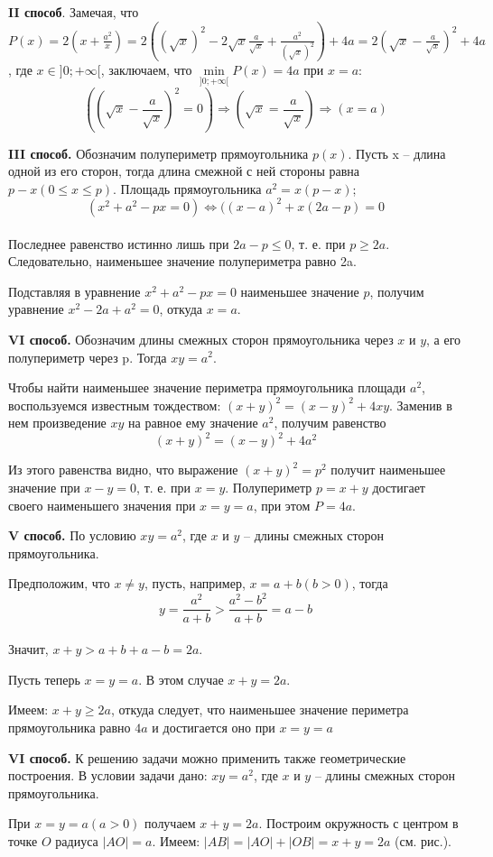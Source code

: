 \documentclass{article}
\begin{document}
\par\textbf{II способ}. Замечая, что $P(x)=2(x+\frac{a^2}{x})=2((\sqrt{x})^2-2\sqrt{x}\frac{a}{\sqrt{x}}+\frac{a^2}{(\sqrt{x})^2})+4a=2(\sqrt{x}-\frac{a}{\sqrt{x}})^2+4a$, где $x\in]0;+\infty[$, заключаем, что $\min\limits_{]0;+\infty[}P(x)=4a$ при $x=a$:
$$((\sqrt{x}-\frac{a}{\sqrt{x}})^2=0)\Rightarrow(\sqrt{x}=\frac{a}{\sqrt{x}})\Rightarrow(x=a)$$
\par\textbf{III способ.} Обозначим полупериметр прямоугольника $p(x)$. Пусть x -- длина одной из его сторон, тогда длина смежной с ней стороны равна $p-x(0\leqslant x\leqslant p)$. Площадь прямоугольника $a^2=x(p-x)$;
$$(x^2+a^2-px=0)\Leftrightarrow((x-a)^2+x(2a-p)=0$$
\\Последнее равенство истинно лишь при $2a-p\leqslant0$, т. е. при $p\geqslant2a$. Следовательно, наименьшее значение полупериметра равно 2a.
\par Подставляя в уравнение $x^2+a^2-px=0$ наименьшее значение $p$, получим уравнение $x^2-2a+a^2=0$, откуда $x=a$.
\par\textbf{VI способ.} Обозначим длины смежных сторон прямоугольника через $x$ и $y$, а его полупериметр через p. Тогда $xy=a^2$.
\par Чтобы найти наименьшее значение периметра прямоугольника площади $a^2$, воспользуемся известным тождеством: $(x+y)^2=(x-y)^2+4xy$. Заменив в нем произведение $xy$ на равное ему значение $a^2$, получим равенство
$$(x+y)^2=(x-y)^2+4a^2$$
\par Из этого равенства видно, что выражение $(x+y)^2=p^2$ получит наименьшее значение при $x-y=0$, т. е. при $x=y$. Полупериметр $p=x+y$ достигает своего наименьшего значения при $x=y=a$, при этом $P=4a$. 
\par\textbf{V способ.} По условию $xy=a^2$, где $x$ и $y$ -- длины смежных сторон прямоугольника.
\par Предположим, что $x\neq y$, пусть, например, $x=a+b(b>0)$, тогда 
$$y=\frac{a^2}{a+b}>\frac{a^2-b^2}{a+b}=a-b$$
\\Значит, $x+y>a+b+a-b=2a$.
\par Пусть теперь $x=y=a$. В этом случае $x+y=2a$.
\par Имеем: $x+y\geqslant2a$, откуда следует, что наименьшее значение периметра прямоугольника равно $4a$ и достигается оно при $x=y=a$
\par\textbf{VI способ.} К решению задачи можно применить также геометрические построения. В условии задачи дано: $xy=a^2$, где $x$ и $y$ -- длины смежных сторон прямоугольника.
\par При $x=y=a(a>0)$ получаем $x+y=2a$. Построим окружность с центром в точке $O$ радиуса $|AO|=a$. Имеем: $|AB|=|AO|+|OB|=x+y=2a$ (см. рис.).
\end{document}
